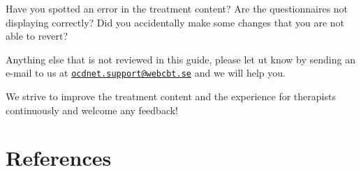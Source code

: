 \documentclass[]{book}
\theoremstyle{definition}
\theoremstyle{definition}
\theoremstyle{definition}
\theoremstyle{remark}
\begin{document}
Have you spotted an error in the treatment content? Are the
questionnaires not displaying correctly? Did you accidentally make some
changes that you are not able to revert?

Anything else that is not reviewed in this guide, please let ut know by
sending an e-mail to us at
\href{mailto:ocdnet.support@webcbt.se}{\nolinkurl{ocdnet.support@webcbt.se}}
and we will help you.

We strive to improve the treatment content and the experience for
therapists continuously and welcome any feedback!

\hypertarget{references}{%
\chapter{References}\label{references}}


\end{document}
